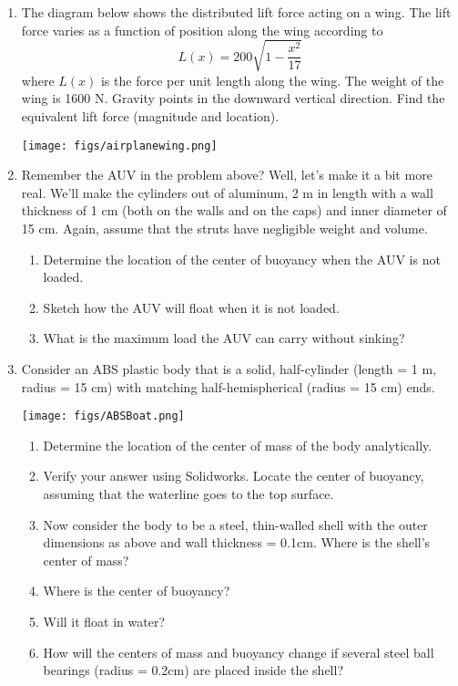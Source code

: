 \documentclass{tufte-handout}
\newcommand{\be}{\begin{enumerate}}
\newcommand{\ee}{\end{enumerate}}
\begin{document}
\begin{enumerate}[resume]
\item The diagram below shows the distributed lift force acting on a wing. The lift force varies as a function of position along the wing according to 
$$L(x) = 200 \sqrt{ 1-\frac{x^2}{17}}$$
where $L(x)$ is the force per unit length along the wing. The weight of the wing is 1600 N. Gravity points in the downward vertical direction. 
Find the equivalent lift force (magnitude and location). 
 \centerline{\texttt{[image: figs/airplanewing.png]}}

 
 \item Remember the AUV in the problem above?  Well, let's make it a bit more real.  We'll make the cylinders out of aluminum, 2 m in length with a wall thickness of 1 cm (both on the walls and on the caps) and inner diameter of 15 cm.  Again, assume that the struts have negligible weight and volume.
\begin{enumerate}
\item Determine the location of the center of buoyancy when the AUV is not loaded.  
\item Sketch how the AUV will float when it is not loaded.
\item What is the maximum load the AUV can carry without sinking?
\ee

\item Consider an ABS plastic body that is a solid, half-cylinder (length = 1 m, radius = 15 cm) with matching half-hemispherical (radius = 15 cm) ends.

\centerline{\texttt{[image: figs/ABSBoat.png]}}

\be
\item  Determine the location of the center of mass of the body analytically. 
\item Verify your answer using Solidworks. Locate the center of buoyancy, assuming that the waterline goes to the top surface. 
\item Now consider the body to be a steel, thin-walled shell with the outer dimensions as above and wall thickness = 0.1cm. Where is the shell's center of mass? 
\item Where is the center of buoyancy? 
\item Will it float in water? 
\item How will the centers of mass and buoyancy change if several steel ball bearings (radius = 0.2cm) are placed inside the shell? 
\end{enumerate}



\end{enumerate}
\end{document}
